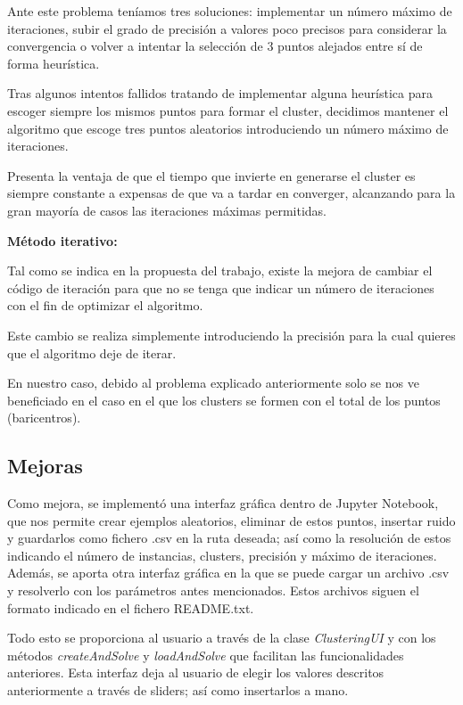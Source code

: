 \documentclass[conference,a4paper]{IEEEtran}
\begin{document}
Ante este problema teníamos tres soluciones: implementar un número máximo de iteraciones, subir el grado de precisión a valores poco precisos para considerar la convergencia o volver a intentar la selección de 3 puntos alejados entre sí de forma heurística.

Tras algunos intentos fallidos tratando de implementar alguna heurística para escoger siempre los mismos puntos para formar el cluster, decidimos mantener el algoritmo que escoge tres puntos aleatorios introduciendo un número máximo de iteraciones.

Presenta la ventaja de que el tiempo que invierte en generarse el cluster es siempre constante a expensas de que va a tardar en converger, alcanzando para la gran mayoría de casos las iteraciones máximas permitidas.

\textbf{Método iterativo:}

Tal como se indica en la propuesta del trabajo, existe la mejora de cambiar el código de iteración para que no se tenga que indicar un número de iteraciones con el fin de optimizar el algoritmo.

Este cambio se realiza simplemente introduciendo la precisión para la cual quieres que el algoritmo deje de iterar.

En nuestro caso, debido al problema explicado anteriormente solo se nos ve beneficiado en el caso en el que los clusters se formen con el total de los puntos (baricentros).

\subsection{Mejoras}

Como mejora, se implementó una interfaz gráfica dentro de Jupyter Notebook, que nos permite crear ejemplos aleatorios, eliminar de estos puntos, insertar ruido y guardarlos como fichero .csv en la ruta deseada; así como la resolución de estos indicando el número de instancias, clusters, precisión y máximo de iteraciones. Además, se aporta otra interfaz gráfica en la que se puede cargar un archivo .csv y resolverlo con los parámetros antes mencionados. Estos archivos siguen el formato indicado en el fichero README.txt.

Todo esto se proporciona al usuario a través de la clase \textit{ClusteringUI} y con los métodos \textit{createAndSolve} y \textit{loadAndSolve} que facilitan las funcionalidades anteriores. Esta interfaz deja al usuario de elegir los valores descritos anteriormente a través de sliders; así como insertarlos a mano.
\end{document}
